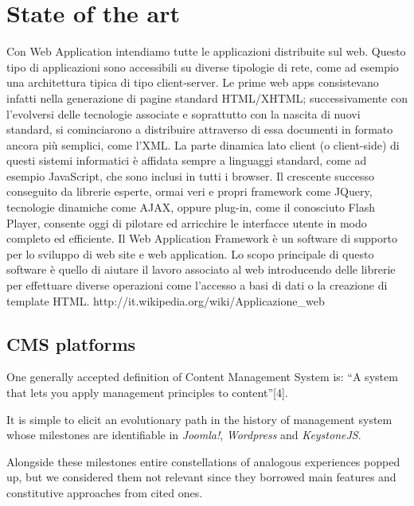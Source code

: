 \documentclass{sig-alternate}
\begin{document}
\section{State of the art}
Con Web Application intendiamo tutte le applicazioni distribuite sul web.
Questo tipo di applicazioni sono accessibili su diverse tipologie di rete, come ad esempio una architettura tipica di tipo client-server.
Le prime web apps consistevano infatti nella generazione di pagine standard HTML/XHTML; successivamente con l'evolversi delle tecnologie associate e soprattutto con la nascita di nuovi standard, si cominciarono a distribuire attraverso di essa documenti in formato ancora più semplici, come l'XML.
La parte dinamica lato client (o client-side) di questi sistemi informatici è affidata sempre a linguaggi standard, come ad esempio JavaScript, che sono inclusi in tutti i browser. Il crescente successo conseguito da librerie esperte, ormai veri e propri framework come JQuery, tecnologie dinamiche come AJAX, oppure plug-in, come il conosciuto Flash Player, consente oggi di pilotare ed arricchire le interfacce utente in modo completo ed efficiente.
Il Web Application Framework è un software di supporto per lo sviluppo di web site e web application. Lo scopo principale di questo software è quello di aiutare il lavoro associato al web introducendo delle librerie per effettuare diverse operazioni come l’accesso a basi di dati o la creazione di template HTML.
{http://it.wikipedia.org/wiki/Applicazione_web}











\subsection{CMS platforms}
One generally accepted definition of Content Management System is: ``A system that lets you apply management principles to content''[4].




It is simple to elicit an evolutionary path in the history of management system whose milestones are identifiable in \emph{Joomla!}\cite{joomla}, \emph{Wordpress}\cite{wordpress} and \emph{KeystoneJS}\cite{keystone}.


Alongside these milestones entire constellations of analogous experiences popped up, but we considered them not relevant since they borrowed main features and constitutive approaches from cited ones. 
\end{document}
